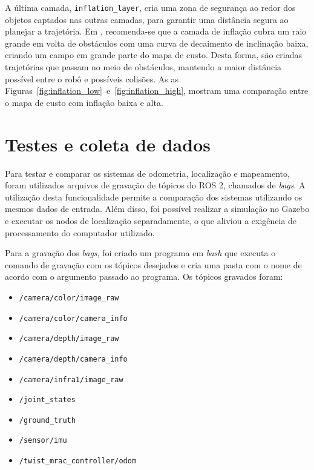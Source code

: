 \documentclass[repeatfields,xlists,xpacks,oneside,yearsonly]{ufrgscca}
\begin{document}

A última camada, \texttt{inflation\_layer}, cria uma zona de segurança ao redor
dos objetos captados nas outras camadas, para garantir uma distância segura
ao planejar a trajetória.
Em \textcite{ros_tuning_guide}, recomenda-se que a camada de inflação cubra
um raio grande em volta de obstáculos com uma curva de decaimento de
inclinação baixa, criando um campo em grande parte do mapa de custo.
Desta forma, são criadas trajetórias que passam no meio de obstáculos,
mantendo a maior distância possível entre o robô e possíveis colisões.
As as Figuras~\ref{fig:inflation_low}~e~\ref{fig:inflation_high}, mostram
uma comparação entre o mapa de custo com inflação baixa e alta.

\section{Testes e coleta de dados}
\label{met:testes}

Para testar e comparar os sistemas de odometria, localização e mapeamento,
foram utilizados arquivos de gravação de tópicos do ROS 2, chamados de
\textit{bags}.
A utilização desta funcionalidade permite a comparação dos sistemas
utilizando os mesmos dados de entrada.
Além disso, foi possível realizar a simulação no Gazebo e executar os nodos
de localização separadamente, o que aliviou a exigência de processamento
do computador utilizado.

Para a gravação dos \textit{bags}, foi criado um programa em \textit{bash}
que executa o comando de gravação com os tópicos desejados e cria uma pasta
com o nome de acordo com o argumento passado ao programa.
Os tópicos gravados foram:
\begin{itemize}
    \item \texttt{/camera/color/image\_raw}
    \item \texttt{/camera/color/camera\_info}
    \item \texttt{/camera/depth/image\_raw}
    \item \texttt{/camera/depth/camera\_info}
    \item \texttt{/camera/infra1/image\_raw}
    \item \texttt{/joint\_states}
    \item \texttt{/ground\_truth}
    \item \texttt{/sensor/imu}
    \item \texttt{/twist\_mrac\_controller/odom}
\end{itemize}
\end{document}

